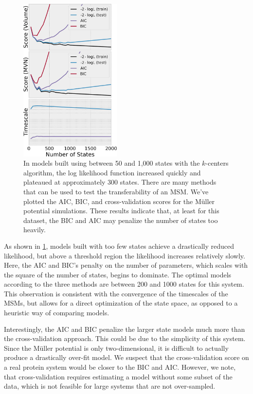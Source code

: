 \documentclass[twocolumn,floatfix,nofootinbib,aps]{revtex4-1}
\begin{document}
\begin{figure}[h]
\centering
\includegraphics[width=2in]{figs/mull_cross_vert.png}
\caption{In models built using between 50 and 1,000 states with the $k$-centers algorithm, the log likelihood function increased quickly and plateaued at approximately 300 states. There are many methods that can be used to test the transferability of an MSM. We've plotted the AIC, BIC, and cross-validation scores for the M\"uller potential simulations. These results indicate that, at least for this dataset, the BIC and AIC may penalize the number of states too heavily.}
\label{fig:mullerlike}
\end{figure}

As shown in \cref{fig:mullerlike}, models built with too few states achieve a drastically reduced likelihood, but above a threshold region the likelihood increases relatively slowly. Here, the AIC and BIC's penalty on the number of parameters, which scales with the square of the number of states, begins to dominate. The optimal models according to the three methods are between 200 and 1000 states for this system. This observation is consistent with the convergence of the timescales of the MSMs, but allows for a direct optimization of the state space, as opposed to a heuristic way of comparing models.

Interestingly, the AIC and BIC penalize the larger state models much more than the cross-validation approach. This could be due to the simplicity of this system. Since the M\"uller potential is only two-dimensional, it is difficult to actually produce a drastically over-fit model. We suspect that the cross-validation score on a real protein system would be closer to the BIC and AIC. However, we note, that cross-validation requires estimating a model without some subset of the data, which is not feasible for large systems that are not over-sampled.
\end{document}
